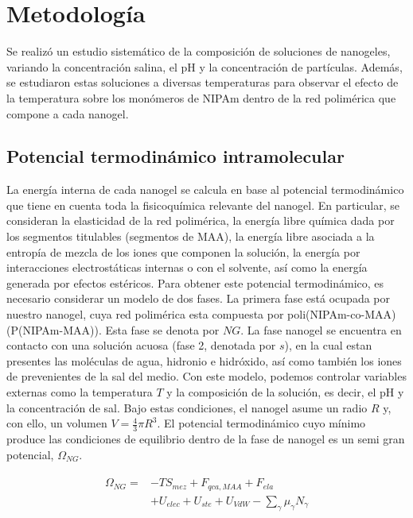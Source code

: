 	
	
	
	
	
	\section{Metodolog\'ia}
	
	Se realiz\'o un estudio sistem\'atico de la composici\'on de soluciones de nanogeles, variando la concentraci\'on salina, el pH y la concentraci\'on de part\'iculas. Adem\'as, se estudiaron estas soluciones a diversas temperaturas para observar el efecto de la temperatura sobre los mon\'omeros de NIPAm dentro de la red polim\'erica que compone a cada nanogel.
	
	\subsection{Potencial termodin\'amico intramolecular}
	
	La energ\'ia interna de cada nanogel se calcula en base al potencial termodin\'amico que tiene en cuenta toda la fisicoqu\'imica relevante del nanogel. En particular, se consideran la elasticidad de la red polim\'erica, la energ\'ia libre qu\'imica dada por los segmentos titulables (segmentos de MAA), la energ\'ia libre asociada a la entrop\'ia de mezcla de los iones que componen la soluci\'on, la energ\'ia por interacciones electrost\'aticas internas o con el solvente, as\'i como la energ\'ia generada por efectos est\'ericos.
	Para obtener este potencial termodin\'amico, es necesario considerar un modelo de dos fases. La primera fase est\'a ocupada por nuestro nanogel, cuya red polim\'erica esta compuesta por poli(NIPAm-co-MAA) (P(NIPAm-MAA)). Esta fase se denota por $NG$. La fase nanogel se encuentra en contacto con una soluci\'on acuosa (fase 2, denotada por $s$), en la cual estan presentes las mol\'eculas de agua, hidronio e hidr\'oxido, as\'i como tambi\'en los iones de prevenientes de la sal del medio.
	Con este modelo, podemos controlar variables externas como la temperatura $T$ y la composici\'on de la soluci\'on, es decir, el pH y la concentraci\'on de sal. Bajo estas condiciones, el nanogel asume un radio $R$ y, con ello, un volumen $V=\frac{4}{3}\pi R^3$.
	El potencial termodin\'amico cuyo m\'inimo produce las condiciones de equilibrio dentro de la fase de nanogel es un semi gran potencial, $\Omega_{NG}$.
	
	
	
	\begin{align}
		\begin{aligned}
			\Omega_{NG}=& -TS_{mez} + F_{qca,MAA} +  F_{ela}\\
			& + U_{elec}+  U_{ste} + U_{VdW} -{\sum_{\gamma}
				{\mu_\gamma N_\gamma}}
		\end{aligned}
		\label{eq:mc:free-energy-implicit}
	\end{align}
	
